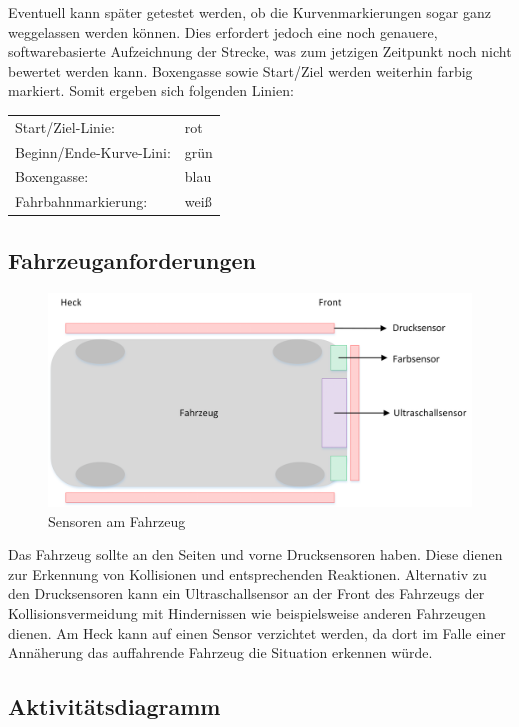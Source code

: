 \documentclass[a4paper,12pt]{article}                                         %
\numberwithin{table}{section}                               %
\numberwithin{figure}{section}                              %
\begin{document}
	\bigskip
	 Eventuell kann später getestet werden, ob die Kurvenmarkierungen sogar ganz weggelassen werden können. Dies erfordert jedoch eine noch genauere, softwarebasierte Aufzeichnung der Strecke, was zum jetzigen Zeitpunkt noch nicht bewertet werden kann. Boxengasse sowie Start/Ziel werden weiterhin farbig markiert. Somit ergeben sich folgenden Linien:
	 
	 \bigskip
	\begin{tabular}{ l  l }
	Start/Ziel-Linie: & rot \\
	Beginn/Ende-Kurve-Lini: & grün \\ 
	Boxengasse: & blau \\
	Fahrbahnmarkierung:	& weiß \\
	\end{tabular}
	
	\newpage
	\subsection{Fahrzeuganforderungen}
		\begin{figure}[h]
					\includegraphics[scale=0.9]{../Bilder/Fahrzeug.png}
					\caption{Sensoren am Fahrzeug}
				\end{figure}
				
	Das Fahrzeug sollte an den Seiten und vorne Drucksensoren haben. Diese dienen zur Erkennung von Kollisionen und entsprechenden Reaktionen. Alternativ zu den Drucksensoren kann ein Ultraschallsensor an der Front des Fahrzeugs der Kollisionsvermeidung mit Hindernissen wie beispielsweise anderen Fahrzeugen dienen. Am Heck kann auf einen Sensor verzichtet werden, da dort im Falle einer Annäherung das auffahrende Fahrzeug die Situation erkennen würde. 
	
	\newpage
	\subsection{Aktivitätsdiagramm}
	
\end{document}
